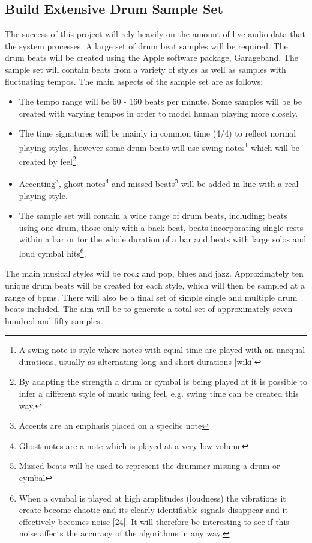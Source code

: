 \documentclass[a4paper, 11pt]{article}
\begin{document}
\subsection{Build Extensive Drum Sample Set}
The success of this project will rely heavily on the amount of live audio data that the system processes. A large set of drum beat samples will be required. The drum beats will be created using the Apple software package, Garageband. The sample set will contain beats from a variety of styles as well as samples with fluctuating tempos. The main aspects of the sample set are as follows:

\begin{itemize}
\item The tempo range will be 60 - 160 beats per minute. Some samples will be be created with varying tempos in order to model human playing more closely.
\item The time signatures will be mainly in common time (4/4) to reflect normal playing styles, however some drum beats will use swing notes\footnote{A swing note is style where notes with equal time are played with an unequal durations, usually as alternating long and short durations [wiki]} which will be created by feel\footnote{By adapting the strength a drum or cymbal is being played at it is possible to infer a different style of music using feel, e.g. swing time can be created this way.}.
\item Accenting\footnote{Accents are an emphasis placed on a specific note}, ghost notes\footnote{Ghost notes are a note which is played at a very low volume} and missed beats\footnote{Missed beats will be used to represent the drummer missing a drum or cymbal} will be added in line with a real playing style.
\item The sample set will contain a wide range of drum beats, including; beats using one drum, those only with a back beat, beats incorporating single rests within a bar or for the whole duration of a bar and beats with large solos and loud cymbal hits\footnote{When a cymbal is played at high amplitudes (loudness) the vibrations it create become chaotic and its clearly identifiable signals disappear and it effectively becomes noise [24]. It will therefore be interesting to see if this noise affects the accuracy of the algorithms in any way.}.
\end{itemize} 

The main musical styles will be rock and pop, blues and jazz. Approximately ten unique drum beats will be created for each style, which will then be sampled at a range of bpms. There will also be a final set of simple single and multiple drum beats included. The aim will be to generate a total set of approximately seven hundred and fifty samples.
\end{document}
